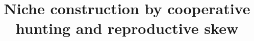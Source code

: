 \documentclass{NSF}
\begin{document}

\title{Niche construction by cooperative hunting and reproductive skew}


\linenumbers %
\newpage {}



\newpage{}
\renewcommand\refname{References Cited}

\end{document}

